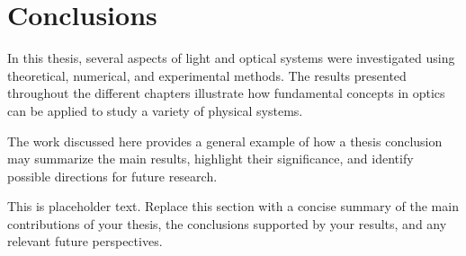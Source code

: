 \chapter{Conclusions}

In this thesis, several aspects of light and optical systems were investigated using theoretical, numerical, and experimental methods. The results presented throughout the different chapters illustrate how fundamental concepts in optics can be applied to study a variety of physical systems.

The work discussed here provides a general example of how a thesis conclusion may summarize the main results, highlight their significance, and identify possible directions for future research.

This is placeholder text. Replace this section with a concise summary of the main contributions of your thesis, the conclusions supported by your results, and any relevant future perspectives.